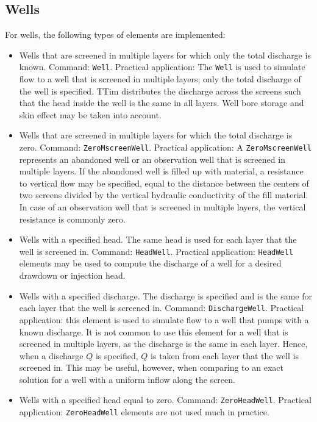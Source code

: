 \documentclass [10pt,letterpaper] {article}
\begin{document}
\subsection{Wells}
For wells, the following types of elements are implemented:
\begin{itemize}
\item Wells that are screened in multiple layers for which only the total discharge is known. Command: {\tt Well}. Practical application: The {\tt Well} is used to simulate flow to a well that is screened in multiple layers; only the total discharge of the well is specified. TTim distributes the discharge across the screens such that the head inside the well is the same in all layers. Well bore storage and skin effect may be taken into account.
\item Wells that are screened in multiple layers for which the total discharge is zero. Command: {\tt ZeroMscreenWell}. Practical application: A {\tt ZeroMscreenWell} represents an abandoned well or an observation well that is screened in multiple layers. If the abandoned well is filled up with material, a resistance to vertical flow may be specified, equal to the distance between the centers of two screens divided by the vertical hydraulic conductivity of the fill material. In case of an observation well that is screened in multiple layers, the vertical resistance is commonly zero.
\item 
Wells with a specified head. The same head is used for each layer that the well is screened in. Command: {\tt HeadWell}. Practical application: {\tt HeadWell} elements may be used to compute the discharge of a well for a desired drawdown or injection head. 
\item Wells with a specified discharge. The discharge is specified and is the same for each layer that the well is screened in. Command: {\tt DischargeWell}. Practical application: this element is used to simulate flow to a well that pumps with a known discharge. It is not common to use this element for a well that is screened in multiple layers, as the discharge is the same in each layer. Hence, when a discharge $Q$ is specified, $Q$ is taken from each layer that the well is screened in. This may be useful, however, when comparing to an exact solution for a well with a uniform inflow along the screen.
\item 
Wells with a specified head equal to zero. Command: {\tt ZeroHeadWell}. Practical application: {\tt ZeroHeadWell} elements are not used much in practice. 
\end{itemize}
\end{document}
